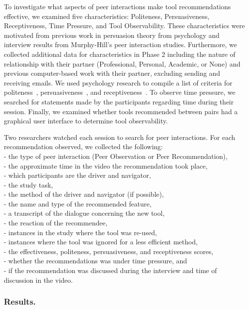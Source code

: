 \documentclass[runningheads]{llncs}
\begin{document}
To investigate what aspects of peer interactions make tool recommendations effective, we examined five characteristics: Politeness, Persuasiveness, Receptiveness, Time Pressure, and Tool Observability. These characteristics were motivated from previous work in persuasion theory from psychology and interview results from Murphy-Hill's peer interaction studies. Furthermore, we collected additional data for characteristics in Phase 2 including the nature of relationship with their partner (Professional, Personal, Academic, or None) and previous computer-based work with their partner, excluding sending and receiving emails. We used psychology research to compile a list of criteria for politeness~\cite{LeechPolite}, persuasiveness~\cite{ShenPersuasive}, and receptiveness~\cite{FoggPersuasiveTech}. To observe time pressure, we searched for statements made by the participants regarding time during their session. Finally, we examined whether tools recommended between pairs had a graphical user interface to determine tool observability. 

Two researchers watched each session to search for peer interactions. For each recommendation observed, we collected the following: \\- the type of peer interaction (Peer Observation or Peer Recommendation), \\
- the approximate time in the video the recommendation took place, \\
- which participants are the driver and navigator,\\
- the study task,\\
- the method of the driver and navigator (if possible),\\
- the name and type of the recommended feature,\\
- a transcript of the dialogue concerning the new tool,\\
- the reaction of the recommendee,\\
- instances in the study where the tool was re-used,\\
- instances where the tool was ignored for a less efficient method,\\
- the effectiveness, politeness, persuasiveness, and receptiveness scores,\\
- whether the recommendations was under time pressure, and\\
- if the recommendation was discussed during the interview and time of discussion in the video.

\subsubsection{Results.}
\end{document}
